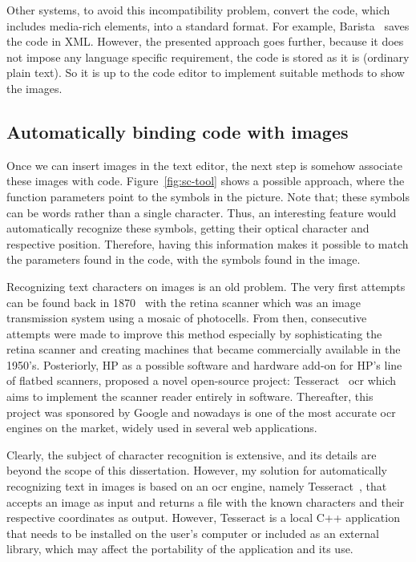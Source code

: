 Other systems, to avoid this incompatibility problem,  convert the code, which includes media-rich elements, into a standard format. For example, Barista~\citep{ko2006barista} saves the code in XML. However, the presented approach goes further, because it does not impose any language specific requirement, the code is stored as it is (ordinary plain text). So it is up to the code editor to implement suitable methods to show the images.

\subsection{Automatically binding code with images}

Once we can insert images in the text editor, the next step is somehow associate these images with code. Figure~\ref{fig:sc-tool} shows a possible approach, where the function parameters point to the symbols in the picture. Note that; these symbols can be words rather than a single character. Thus, an interesting feature would automatically recognize these symbols, getting their optical character and respective position. Therefore, having this information makes it possible to match the parameters found in the code, with the symbols found in the image.

Recognizing text characters on images is an old problem. The very first attempts can be found back in 1870~\citep{eikvil1993optical} with the retina scanner which was an image transmission system using a mosaic of photocells. From then, consecutive attempts were made to improve this method especially by sophisticating the retina scanner and creating machines that became commercially available in the 1950's. Posteriorly, HP as a possible software and hardware add-on for HP's line of flatbed scanners, proposed a novel open-source project: Tesseract~\citep{smith2007overview} \gls{ocr} which aims to implement the scanner reader entirely in software. Thereafter, this project was sponsored by Google and nowadays is one of the most accurate \gls{ocr} engines on the market, widely used in several web applications.

Clearly, the subject of character recognition is extensive, and its details are beyond the scope of this dissertation. However, my solution for automatically recognizing text in images is based on an \gls{ocr} engine, namely Tesseract~\citep{smith2007overview}, that accepts an image as input and returns a file with the known characters and their respective coordinates as output. However, Tesseract is a local C++ application that needs to be installed on the user's computer or included as an external library, which may affect the portability of the application and its use.

